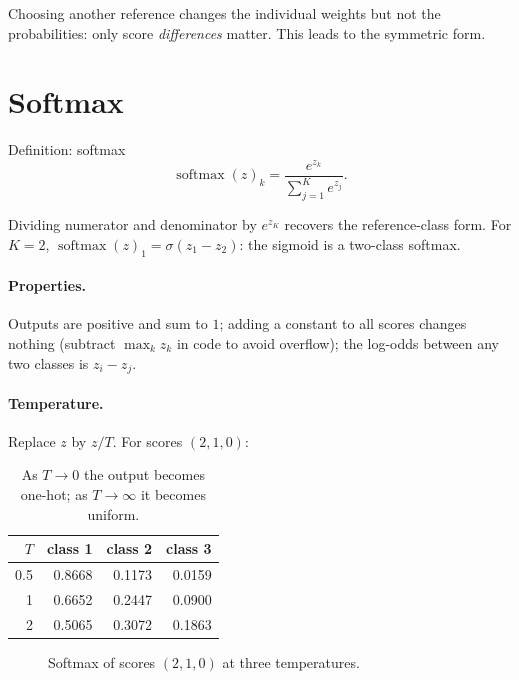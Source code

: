 \documentclass[11pt,a4paper]{article}
\DeclareMathOperator{\softmax}{softmax}
\theoremstyle{definition}
\begin{document}
Choosing another reference changes the individual weights but not the probabilities: only score \emph{differences} matter. This leads to the symmetric form.

\section{Softmax}

\begin{metric}{Definition: softmax}
\[
\softmax(z)_k=\frac{e^{z_k}}{\sum_{j=1}^{K}e^{z_j}}.
\]
\end{metric}

Dividing numerator and denominator by $e^{z_K}$ recovers the reference-class form. For $K=2$,
$\softmax(z)_1=\sigma(z_1-z_2)$: the sigmoid is a two-class softmax.

\paragraph{Properties.} Outputs are positive and sum to $1$; adding a constant to all scores changes nothing (subtract $\max_k z_k$ in code to avoid overflow); the log-odds between any two classes is $z_i-z_j$.

\paragraph{Temperature.} Replace $z$ by $z/T$. For scores $(2,1,0)$:
\begin{table}[h]
\centering
\begin{tabular}{rrrr}
\toprule
$T$ & class 1 & class 2 & class 3\\
\midrule
0.5 & 0.8668 & 0.1173 & 0.0159\\
1 & 0.6652 & 0.2447 & 0.0900\\
2 & 0.5065 & 0.3072 & 0.1863\\
\bottomrule
\end{tabular}
\caption{As $T\to0$ the output becomes one-hot; as $T\to\infty$ it becomes uniform.}
\end{table}

\begin{figure}[h]
\centering
{}
\caption{Softmax of scores $(2,1,0)$ at three temperatures.}
\end{figure}
\end{document}
